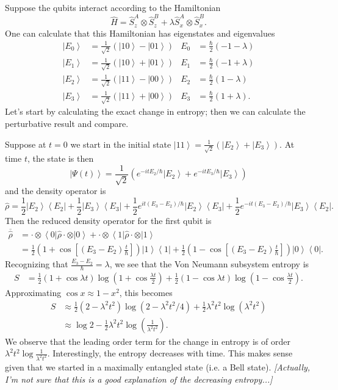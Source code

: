 \documentclass[11pt]{article}
\newcommand{\bra}[1]{\left\langle#1\right|}
\newcommand{\ket}[1]{\left|#1\right\rangle}
\newcommand{\op}[1]{\hat{#1}}
\theoremstyle{theorem}
\theoremstyle{remark}
\theoremstyle{step}
\theoremstyle{gap}
\begin{document}
Suppose the qubits interact according to the Hamiltonian
\[
\op{H} = \op{S}_z^{A}\otimes\op{S}_z^B + \lambda \op{S}_x^A \otimes \op{S}_x^B.
\]
One can calculate that this Hamiltonian has eigenstates and eigenvalues
\begin{align*}
\ket{E_0} &= \frac{1}{\sqrt{2}} \left(\ket{10}-\ket{01}\right) &
E_0 &= \frac{\hbar}{2} \left(-1-\lambda\right) \\
\ket{E_1} &= \frac{1}{\sqrt{2}} \left(\ket{10}+\ket{01}\right) &
E_1 &= \frac{\hbar}{2} \left(-1+\lambda\right) \\
\ket{E_2} &= \frac{1}{\sqrt{2}} \left(\ket{11}-\ket{00}\right) &
E_2 &= \frac{\hbar}{2} \left(1-\lambda\right) \\
\ket{E_3} &= \frac{1}{\sqrt{2}} \left(\ket{11}+\ket{00}\right) &
E_3 &= \frac{\hbar}{2} \left(1+\lambda\right).
\end{align*}
Let's start by calculating the exact change in entropy; then we can calculate the perturbative result and compare.

Suppose at \(t=0\) we start in the initial state \(\ket{11} = \frac{1}{\sqrt{2}}\left(\ket{E_2}+\ket{E_3}\right)\). At time \(t\), the state is then
\[
\ket{\Psi(t)} = \frac{1}{\sqrt{2}}\left(e^{-itE_2/\hbar}\ket{E_2} + e^{-itE_3/\hbar} \ket{E_3}\right)
\]
and the density operator is
\[
\op{\rho} = \frac{1}{2}\ket{E_2}\bra{E_2} + \frac{1}{2}\ket{E_3}\bra{E_3} + \frac{1}{2} e^{it\left(E_3-E_2\right)/\hbar} \ket{E_2}\bra{E_3} + \frac{1}{2} e^{-it\left(E_3 - E_2\right)/\hbar} \ket{E_3}\bra{E_2}.
\]
Then the reduced density operator for the first qubit is
\begin{align*}
\overline{\op{\rho}} &= \cdot\otimes\bra{0} \op{\rho} \cdot\otimes\ket{0} + \cdot\otimes\bra{1} \op{\rho} \cdot\otimes\ket{1} \\
&= \frac{1}{2}\left(1 + \cos \left[\left(E_3-E_2\right)\frac{t}{\hbar}\right] \right)\ket{1}\bra{1} + \frac{1}{2}\left(1 -\cos \left[\left(E_3-E_2\right)\frac{t}{\hbar}\right] \right)\ket{0}\bra{0}.
\end{align*}
Recognizing that \(\frac{E_3-E_2}{\hbar} = \lambda\), we see that the Von Neumann subsystem entropy is
\begin{align*}
S &= \frac{1}{2}\left(1 + \cos \lambda t \right)\log \left(1+\cos \frac{\lambda t}{2}\right)
+ \frac{1}{2}\left(1 - \cos \lambda t \right)\log \left(1-\cos \frac{\lambda t}{2}\right).
\end{align*}
Approximating \(\cos x \approx 1-x^2\), this becomes
\begin{align*}
S &\approx \frac{1}{2}\left(2-\lambda^2 t^2\right) \log \left(2-\lambda^2 t^2/4\right) + \frac{1}{2}\lambda^2 t^2 \log \left(\lambda^2 t^2\right) \\
&\approx \log 2 - \frac{1}{2}\lambda^2 t^2 \log \left(\frac{1}{\lambda^2 t^2}\right).
\end{align*}
We observe that the leading order term for the change in entropy is of order \(\lambda^2t^2 \log \frac{1}{\lambda^2 t^2}\). Interestingly, the entropy decreases with time. This makes sense given that we started in a maximally entangled state (i.e. a Bell state). \emph{[Actually, I'm not sure that this is a good explanation of the decreasing entropy...]}
\end{document}
